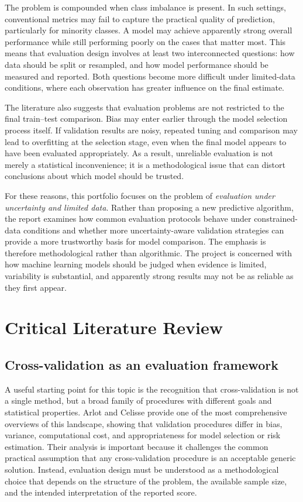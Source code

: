 \documentclass[11pt,a4paper]{article}
\begin{document}
The problem is compounded when class imbalance is present. In such settings, conventional metrics may fail to capture the practical quality of prediction, particularly for minority classes. A model may achieve apparently strong overall performance while still performing poorly on the cases that matter most. This means that evaluation design involves at least two interconnected questions: how data should be split or resampled, and how model performance should be measured and reported. Both questions become more difficult under limited-data conditions, where each observation has greater influence on the final estimate.

The literature also suggests that evaluation problems are not restricted to the final train--test comparison. Bias may enter earlier through the model selection process itself. If validation results are noisy, repeated tuning and comparison may lead to overfitting at the selection stage, even when the final model appears to have been evaluated appropriately. As a result, unreliable evaluation is not merely a statistical inconvenience; it is a methodological issue that can distort conclusions about which model should be trusted.

For these reasons, this portfolio focuses on the problem of \emph{evaluation under uncertainty and limited data}. Rather than proposing a new predictive algorithm, the report examines how common evaluation protocols behave under constrained-data conditions and whether more uncertainty-aware validation strategies can provide a more trustworthy basis for model comparison. The emphasis is therefore methodological rather than algorithmic. The project is concerned with how machine learning models should be judged when evidence is limited, variability is substantial, and apparently strong results may not be as reliable as they first appear.

\section{Critical Literature Review}

\subsection{Cross-validation as an evaluation framework}

A useful starting point for this topic is the recognition that cross-validation is not a single method, but a broad family of procedures with different goals and statistical properties. Arlot and Celisse \cite{arlot2010survey} provide one of the most comprehensive overviews of this landscape, showing that validation procedures differ in bias, variance, computational cost, and appropriateness for model selection or risk estimation. Their analysis is important because it challenges the common practical assumption that any cross-validation procedure is an acceptable generic solution. Instead, evaluation design must be understood as a methodological choice that depends on the structure of the problem, the available sample size, and the intended interpretation of the reported score.
\end{document}
